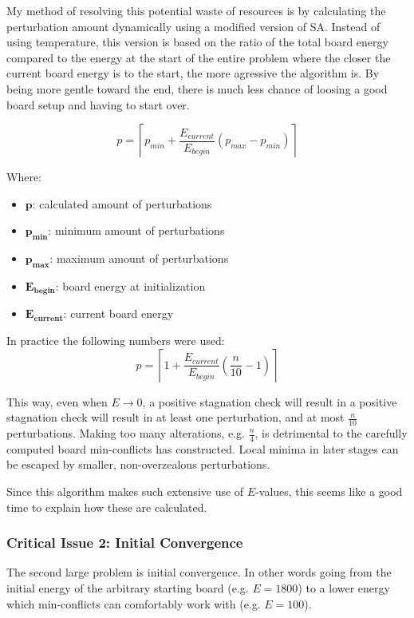 \documentclass{article}
\begin{document}
My method of resolving this potential waste of resources is by calculating the perturbation amount dynamically using a modified version of SA.
Instead of using temperature,
this version is based on the ratio of the total board energy compared to the energy at the start of the entire problem where the closer the current board energy is to the start,
the more agressive the algorithm is. By being more gentle toward the end, there is much less chance of loosing a good board setup and having to start over.

\[
    p = \left\lceil p_{min}+\frac{E_{current}}{E_{begin}} \left(p_{max} - p_{min}\right)\right\rceil
\]

Where:
\begin{itemize}
    \item $\mathbf{p}$: calculated amount of perturbations
    \item $\mathbf{p_{min}}$: minimum amount of perturbations
    \item $\mathbf{p_{max}}$: maximum amount of perturbations
    \item $\mathbf{E_{begin}}$: board energy at initialization
    \item $\mathbf{E_{current}}$: current board energy
\end{itemize}

In practice the following numbers were used:
\[
    p = \left\lceil 1+\frac{E_{current}}{E_{begin}} \left(\frac{n}{10} - 1\right)\right\rceil
\]

This way, even when $E\to0$, a positive stagnation check will result in a positive stagnation check will result in at least one perturbation, and at most $\frac{n}{10}$ perturbations.
Making too many alterations, e.g. $\frac{n}{4}$, is detrimental to the carefully computed board min-conflicts has constructed. Local minima in later stages can be escaped by smaller, non-overzealous perturbations.

Since this algorithm makes such extensive use of $E$-values, this seems like a good time to explain how these are calculated.


\subsubsection{Critical Issue 2: Initial Convergence}
The second large problem is initial convergence. In other words going from the initial energy of the arbitrary starting board (e.g. $E=1800$)
to a lower energy which min-conflicts can comfortably work with (e.g. $E=100$).
\end{document}
